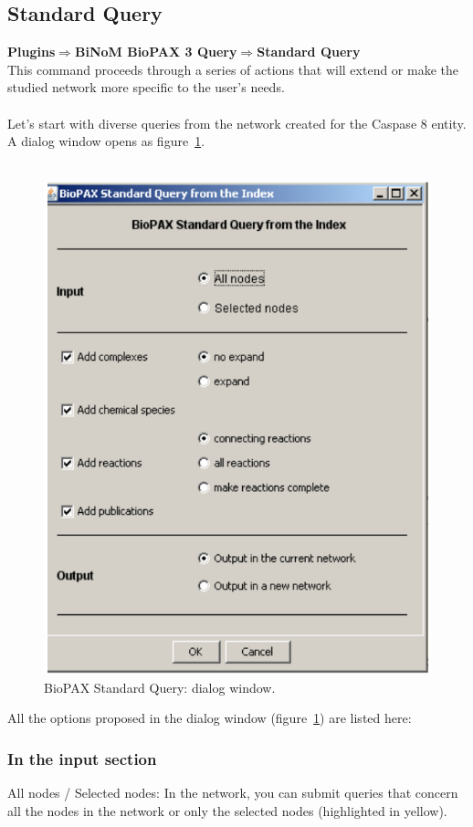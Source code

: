 \subsection{Standard Query}
\textbf{Plugins$\Rightarrow$BiNoM BioPAX 3 Query$\Rightarrow$Standard Query}\\
This command proceeds through a series of actions that will extend or make the studied network more specific to the user’s needs.\\\\
Let’s start with diverse queries from the network created for the Caspase 8 entity. A dialog window opens as figure~\ref{Standard_Query_Dialog}.\\\\
\begin{figure}[h]
\centering
\includegraphics[width=12 cm]{graphics/Standard_Query_Dialog}
\caption{BioPAX Standard Query: dialog window.}
\label{Standard_Query_Dialog}
\end{figure}
All the options proposed in the dialog window (figure~\ref{Standard_Query_Dialog}) are listed here:
\subsubsection{In the input section}
All nodes / Selected nodes: In the network, you can submit queries that concern all the nodes in the network or only the selected nodes (highlighted in yellow). 
